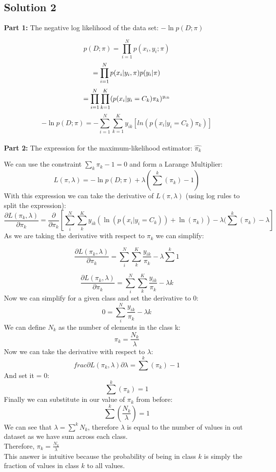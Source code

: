 \documentclass[submit]{harvardml}
\begin{document}
\subsection*{Solution 2}
\textbf{Part 1:} The negative log likelihood of the data set: $-\ln p(D; \pi)$

$$
 p(D;\pi) = \prod_{i=1}^{N} p(x_i, y_i; \pi)
$$
$$
= \prod_{i=1}^{N} p(x_i| y_i, \pi) p(y_i|\pi) \\
$$
$$
= \prod_{i=1}^{N} \prod_{k=1}^{K} (p(x_i| y_i = C_k) \pi_k)^{y_{ik}} \\
$$
$$
-\ln p(D; \pi) = - \sum_{i=1}^N \sum_{k=1}^K y_{ik}[ln(p(x_i|y_i = C_k) \pi_k)]
$$
\\

\textbf{Part 2:} The expression for the maximum-likelihood estimator: $\hat{\pi_k}$

We can use the constraint $\sum_k\pi_k - 1 = 0$ and form a Larange Multiplier:
$$
    L(\pi, \lambda) = -\ln p(D; \pi) + \lambda(\sum^k (\pi_k) -1)
$$
With this expression we can take the derivative of $L(\pi, \lambda)$ (using log rules to split the expression):\\
$$
    \frac{\partial L(\pi_k, \lambda)}{\partial \pi_k} = \frac{\partial}{\partial \pi_k} \left[ \sum^N_i \sum^K_k y_{ik} \left( \ln (p(x_i | y_i = C_k )) + \ln(\pi_k)  \right) - \lambda(\sum^k (\pi_k) -\lambda  \right]
$$
As we are taking the derivative with respect to $\pi_k$ we can simplify:

$$
    \frac{\partial L(\pi_k, \lambda)}{\partial \pi_k} =
    \sum^N_i \sum^K_k \frac{y_{ik}}{\pi_k} - \lambda\sum^k 1
$$

$$
    \frac{\partial L(\pi_k, \lambda)}{\partial \pi_k} =
    \sum^N_i \sum^K_k \frac{y_{ik}}{\pi_k} - \lambda k
$$
Now we can simplify for a given class and set the derivative to 0:
$$
    0 = \sum^N_i  \frac{y_{ik}}{\pi_k} - \lambda k
$$
We can define $N_k$ as the number of elements in the class k:
$$
    \pi_k = \frac{N_k} {\lambda}
$$
Now we can take the derivative with respect to $\lambda$:
$$
frac{\partial L(\pi_k, \lambda)}{\partial \lambda} = \sum^k (\pi_k) -1
$$
And set it = 0:
$$
\sum^k (\pi_k) = 1
$$
Finally we can substitute in our value of $\pi_k$ from before:
$$
\sum^k (\frac{N_k} {\lambda}) = 1
$$
We can see that $\lambda=\sum^k N_k$, therefore $\lambda$ is equal to the number of values in out dataset as we have sum across each class. \\
Therefore, $\pi_k = \frac{N_k}{\lambda}$\\

This answer is intuitive because the probability of being in class $k$ is simply the fraction of values in class $k$ to all values.
\end{document}
